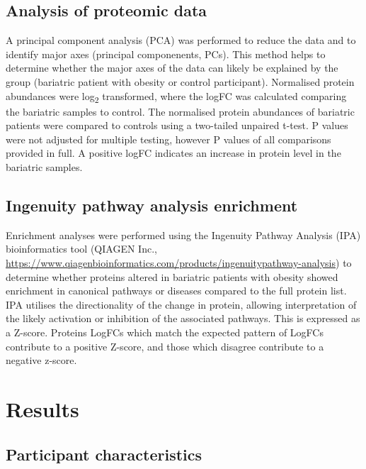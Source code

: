 \documentclass[11pt,twoside]{bristolthesis}
\begin{document}
\hypertarget{analysis-of-proteomic-data}{%
\subsection{Analysis of proteomic data}\label{analysis-of-proteomic-data}}

A principal component analysis (PCA) was performed to reduce the data and to identify major axes (principal componenents, PCs). This method helps to determine whether the major axes of the data can likely be explained by the group (bariatric patient with obesity or control participant). Normalised protein abundances were log\textsubscript{2} transformed, where the logFC was calculated comparing the bariatric samples to control. The normalised protein abundances of bariatric patients were compared to controls using a two-tailed unpaired t-test. P values were not adjusted for multiple testing, however P values of all comparisons provided in full. A positive logFC indicates an increase in protein level in the bariatric samples.

\hypertarget{ingenuity-pathway-analysis-enrichment}{%
\subsection{Ingenuity pathway analysis enrichment}\label{ingenuity-pathway-analysis-enrichment}}

Enrichment analyses were performed using the Ingenuity Pathway Analysis (IPA) bioinformatics tool (QIAGEN Inc., \url{https://www.qiagenbioinformatics.com/products/ingenuitypathway-analysis}) to determine whether proteins altered in bariatric patients with obesity showed enrichment in canonical pathways or diseases compared to the full protein list. IPA utilises the directionality of the change in protein, allowing interpretation of the likely activation or inhibition of the associated pathways. This is expressed as a Z-score. Proteins LogFCs which match the expected pattern of LogFCs contribute to a positive Z-score, and those which disagree contribute to a negative z-score.

\hypertarget{results-1}{%
\section{Results}\label{results-1}}

\hypertarget{participant-characteristics}{%
\subsection{Participant characteristics}\label{participant-characteristics}}
\end{document}
